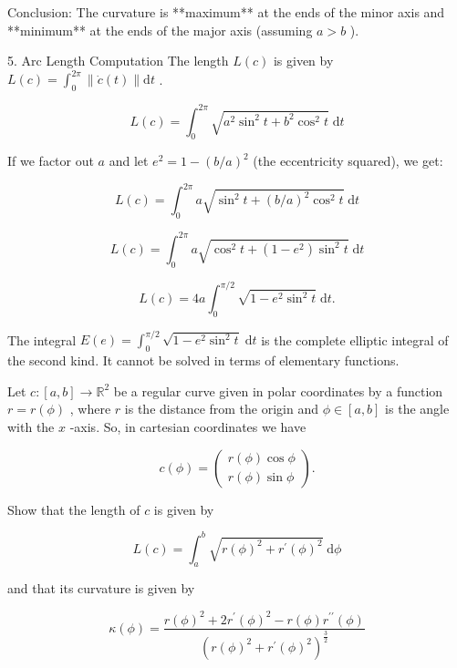 \documentclass[10pt]{article}
\begin{document}
Conclusion: The curvature is **maximum** at the ends of the minor axis and **minimum** at the ends of the major axis (assuming \(a > b\) ).

5. Arc Length Computation The length \(L\left( c\right)\) is given by \(L\left( c\right)  = {\int }_{0}^{2\pi }\parallel \dot{c}\left( t\right) \parallel \mathrm{d}t\) .

\[
L\left( c\right)  = {\int }_{0}^{2\pi }\sqrt{{a}^{2}{\sin }^{2}t + {b}^{2}{\cos }^{2}t}\mathrm{\;d}t
\]

If we factor out \(a\) and let \({e}^{2} = 1 - {\left( b/a\right) }^{2}\) (the eccentricity squared), we get:

\[
L\left( c\right)  = {\int }_{0}^{2\pi }a\sqrt{{\sin }^{2}t + {\left( b/a\right) }^{2}{\cos }^{2}t}\mathrm{\;d}t
\]

\[
L\left( c\right)  = {\int }_{0}^{2\pi }a\sqrt{{\cos }^{2}t + \left( {1 - {e}^{2}}\right) {\sin }^{2}t}\mathrm{\;d}t
\]

\[
L\left( c\right)  = {4a}{\int }_{0}^{\pi /2}\sqrt{1 - {e}^{2}{\sin }^{2}t}\mathrm{\;d}t.
\]

The integral \(E\left( e\right)  = {\int }_{0}^{\pi /2}\sqrt{1 - {e}^{2}{\sin }^{2}t}\mathrm{\;d}t\) is the complete elliptic integral of the second kind. It cannot be solved in terms of elementary functions.

\begin{problem}[title=PROBLEM 3 (7 POINTS)]
Let \(c : \left\lbrack  {a,b}\right\rbrack   \rightarrow  {\mathbb{R}}^{2}\) be a regular curve given in polar coordinates by a function \(r = r\left( \phi \right)\) , where \(r\) is the distance from the origin and \(\phi  \in  \left\lbrack  {a,b}\right\rbrack\) is the angle with the \(x\) -axis. So, in cartesian coordinates we have

\[
c\left( \phi \right)  = \left( \begin{array}{l} r\left( \phi \right) \cos \phi \\  r\left( \phi \right) \sin \phi  \end{array}\right) .
\]

Show that the length of \(c\) is given by

\[
L\left( c\right)  = {\int }_{a}^{b}\sqrt{r{\left( \phi \right) }^{2} + {r}^{\prime }{\left( \phi \right) }^{2}}\mathrm{\;d}\phi
\]

and that its curvature is given by

\[
\kappa \left( \phi \right)  = \frac{r{\left( \phi \right) }^{2} + 2{r}^{\prime }{\left( \phi \right) }^{2} - r\left( \phi \right) {r}^{\prime \prime }\left( \phi \right) }{{\left( r{\left( \phi \right) }^{2} + {r}^{\prime }{\left( \phi \right) }^{2}\right) }^{\frac{3}{2}}}
\]
\end{problem}
\end{document}
